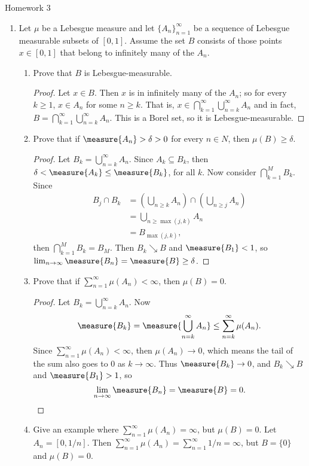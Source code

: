 \documentclass[12pt,letterpaper]{article}
\begin{document}
\pagestyle{fancy}
\begin{center}
{\Large Homework 3}%
\end{center}

\begin{enumerate}
\item Let $\mu$ be a Lebesgue measure and let $\{A_n\}_{n=1}^\infty$ be a sequence of Lebesgue measurable subsets of $[0, 1]$. Assume the set $B$ consists of those points $x \in [0, 1]$ that belong
to infinitely many of the $A_n$.
	\begin{enumerate}[label=(\roman*)]
	\item Prove that $B$ is Lebesgue-measurable.
		\begin{proof}
		Let $x\in B$. Then $x$ is in infinitely many of the $A_n$; so for every $k \geq 1$, $x\in A_n$ for some $n\geq k$. That is, $x\in\bigcap_{k=1}^\infty\bigcup_{n=k}^\infty A_n$ and in fact, $B=\bigcap_{k=1}^\infty\bigcup_{n=k}^\infty A_n$. This is a Borel set, so it is Lebesgue-measurable. 
		\end{proof}
	\item Prove that if $\measure{A_n} > \delta > 0$ for every $n \in N$, then $\mu(B) \geq \delta$.
		\begin{proof}
		Let $B_k=\bigcup_{n=k}^\infty A_n$. Since $A_k\subseteq B_k$, then $\delta<\measure{A_k}\leq\measure{B_k}$, for all $k$. Now consider $\bigcap_{k=1}^M B_k$. Since 
		\begin{align*}
		B_j\cap B_k&= \left(\bigcup_{n\geq k}A_n\right)\cap\left(\bigcup_{n\geq j}A_n\right)\\
		&= \bigcup_{n\geq \max(j,k)}A_n\\
		&= B_{\max(j,k)},
		\end{align*}		 
		then $\bigcap_{k=1}^M B_k=B_M$. Then $B_k \searrow B$ and $\measure{B_1}<1$, so $\lim_{n\to\infty} \measure{B_n} = \measure{B} \geq \delta$. 
		\end{proof}
	\item Prove that if $\sum_{n=1}^\infty \mu(A_n) < \infty$, then $\mu(B) = 0$.
		\begin{proof}
		Let $B_k=\bigcup_{n=k}^\infty A_n$. Now
		$$\measure{B_k}=\measure{\bigcup_{n=k}^\infty A_n} \leq \sum_{n=k}^\infty \mu(A_n).$$
		Since $\sum_{n=1}^\infty \mu(A_n) < \infty$, then $\mu(A_n)\to0$, which means the tail of the sum also goes to $0$ as $k\to\infty$. Thus $\measure{B_k}\to0$, and $B_k \searrow B$ and $\measure{B_1}>1$, so 
		$$\lim_{n\to\infty} \measure{B_n} = \measure{B} =0.$$ 
		\end{proof}
	\item Give an example where $\sum_{n=1}^\infty \mu(A_n) = \infty$, but $\mu(B) = 0$. 
		\answer Let $A_n=[0,1/n]$. Then $\sum_{n=1}^\infty \mu(A_n) = \sum_{n=1}^\infty 1/n = \infty$, but $B=\{0\}$ and $\mu(B) = 0$. 
	\end{enumerate}
	

\end{enumerate}
\end{document}
